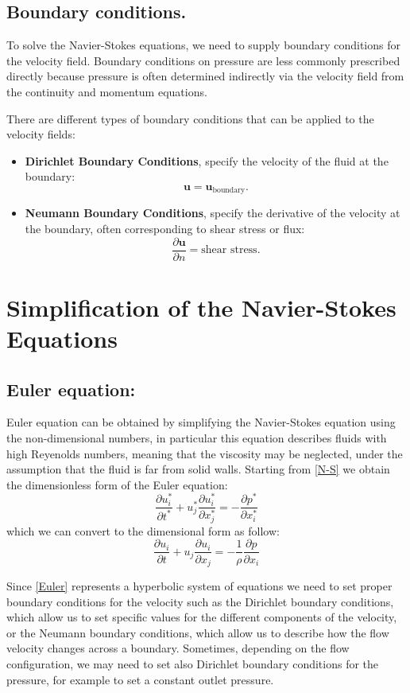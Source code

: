 \documentclass{article}
\begin{document}
\subsection{Boundary conditions.}
To solve the Navier-Stokes equations, we need to supply boundary conditions for the velocity field. Boundary conditions on pressure are less commonly prescribed directly because pressure is often determined indirectly via the velocity field from the continuity and momentum equations.

There are different types of boundary conditions that can be applied to the velocity fields:

\begin{itemize}
    \item \textbf{Dirichlet Boundary Conditions}, specify the velocity of the fluid at the boundary:
    \[
    \mathbf{u} = \mathbf{u}_{\text{boundary}}.
    \]

    \item \textbf{Neumann Boundary Conditions}, specify the derivative of the velocity at the boundary, often corresponding to shear stress or flux:
    \[
    \frac{\partial \mathbf{u}}{\partial n} = \text{shear stress}.
    \]
\end{itemize}


\section{Simplification of the Navier-Stokes Equations}
\subsection{Euler equation:}
Euler equation can be obtained by simplifying the Navier-Stokes equation using the non-dimensional numbers, in particular this equation describes fluids with high Reyenolds numbers, meaning that the viscosity may be neglected, under the assumption that the fluid is far from solid walls.
Starting from \eqref{N-S} we obtain the dimensionless form of the Euler equation:
\[
    \frac{\partial u_i^*}{\partial t^*} + u_j^* \frac{\partial u_i^*}{\partial x_j^*} = - \frac{\partial p^*}{\partial x_i^*}
\]
which we can convert to the dimensional form as follow:
\begin{equation}
    \frac{\partial u_i}{\partial t} + u_j \frac{\partial u_i}{\partial x_j} = -\frac{1}{\rho} \frac{\partial p}{\partial x_i} \label{Euler}
\end{equation}

Since \eqref{Euler} represents a hyperbolic system of equations we need to set proper boundary conditions for the velocity such as the Dirichlet boundary conditions, which allow us to set specific values for the different components of the velocity, or the Neumann boundary conditions, which allow us to describe how the flow velocity changes across a boundary.
Sometimes, depending on the flow configuration, we may need to set also Dirichlet boundary conditions for the pressure, for example to set a constant outlet pressure.
\end{document}
